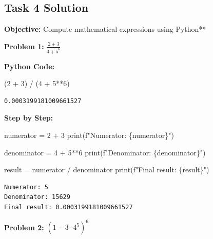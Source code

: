 \documentclass[
  11pt,
]{article}
\newenvironment{Shaded}{\begin{snugshade}}{\end{snugshade}}
\newcommand{\BuiltInTok}[1]{\textcolor[rgb]{0.00,0.23,0.31}{#1}}
\newcommand{\DecValTok}[1]{\textcolor[rgb]{0.68,0.00,0.00}{#1}}
\newcommand{\NormalTok}[1]{\textcolor[rgb]{0.00,0.23,0.31}{#1}}
\newcommand{\OperatorTok}[1]{\textcolor[rgb]{0.37,0.37,0.37}{#1}}
\newcommand{\SpecialCharTok}[1]{\textcolor[rgb]{0.37,0.37,0.37}{#1}}
\newcommand{\SpecialStringTok}[1]{\textcolor[rgb]{0.13,0.47,0.30}{#1}}
\begin{document}
\subsection{Task 4 Solution}\label{task-4-solution}

\textbf{Objective:} Compute mathematical expressions using Python**

\textbf{Problem 1:} \(\frac{2 + 3}{4 + 5^6}\)

\textbf{Python Code:}

\begin{Shaded}
\begin{Highlighting}[]
\NormalTok{(}\DecValTok{2} \OperatorTok{+} \DecValTok{3}\NormalTok{) }\OperatorTok{/}\NormalTok{ (}\DecValTok{4} \OperatorTok{+} \DecValTok{5}\OperatorTok{**}\DecValTok{6}\NormalTok{)}
\end{Highlighting}
\end{Shaded}

\begin{verbatim}
0.0003199181009661527
\end{verbatim}

\textbf{Step by Step:}

\begin{Shaded}
\begin{Highlighting}[]
\NormalTok{numerator }\OperatorTok{=} \DecValTok{2} \OperatorTok{+} \DecValTok{3}
\BuiltInTok{print}\NormalTok{(}\SpecialStringTok{f"Numerator: }\SpecialCharTok{\{}\NormalTok{numerator}\SpecialCharTok{\}}\SpecialStringTok{"}\NormalTok{)}

\NormalTok{denominator }\OperatorTok{=} \DecValTok{4} \OperatorTok{+} \DecValTok{5}\OperatorTok{**}\DecValTok{6}
\BuiltInTok{print}\NormalTok{(}\SpecialStringTok{f"Denominator: }\SpecialCharTok{\{}\NormalTok{denominator}\SpecialCharTok{\}}\SpecialStringTok{"}\NormalTok{)}

\NormalTok{result }\OperatorTok{=}\NormalTok{ numerator }\OperatorTok{/}\NormalTok{ denominator}
\BuiltInTok{print}\NormalTok{(}\SpecialStringTok{f"Final result: }\SpecialCharTok{\{}\NormalTok{result}\SpecialCharTok{\}}\SpecialStringTok{"}\NormalTok{)}
\end{Highlighting}
\end{Shaded}

\begin{verbatim}
Numerator: 5
Denominator: 15629
Final result: 0.0003199181009661527
\end{verbatim}

\textbf{Problem 2:} \((1 - 3 \cdot 4^5)^6\)
\end{document}
